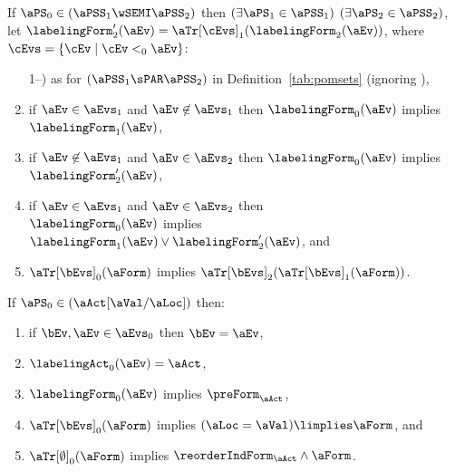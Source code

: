 \begin{definition}
  \noindent
  If $\aPS_0 \in (\aPSS_1\wSEMI\aPSS_2)$ then
  $(\exists\aPS_1\in\aPSS_1)$ $(\exists\aPS_2\in\aPSS_2)$,\\
  let $\labelingForm'_2(\aEv)=\aTr[\cEvs]_1(\labelingForm_2(\aEv))$, where $\cEvs=\{ \cEv \mid \cEv <_0 \aEv \}$:
  \begin{enumerate}  
  \setcounter{enumi}{\value{pomsetParXount}}
  \item[1--\thepomsetParXount)] as for $(\aPSS_1\sPAR\aPSS_2)$  in
    Definition~\ref{tab:pomsets} (ignoring \thepomsetParDisjointXount),
  \item if $\aEv\in\aEvs_1$ and $\aEv\not\in\aEvs_1$ then $\labelingForm_0(\aEv)$ implies $\labelingForm_1(\aEv)$,
  \item if $\aEv\not\in\aEvs_1$ and $\aEv\in\aEvs_2$ then $\labelingForm_0(\aEv)$ implies $\labelingForm'_2(\aEv)$,
  \item if $\aEv\in\aEvs_1$ and $\aEv\in\aEvs_2$ then\\ $\labelingForm_0(\aEv)$ implies $\labelingForm_1(\aEv)\lor\labelingForm'_2(\aEv)$, and
  \item $\aTr[\bEvs]_0(\aForm)$ implies $\aTr[\bEvs]_2(\aTr[\bEvs]_1(\aForm))$.
  \end{enumerate}

  \noindent
  If $\aPS_0 \in (\aAct[\aVal/\aLoc])$ then:
  \begin{enumerate}
  \item if $\bEv,\aEv\in\aEvs_0$ then $\bEv=\aEv$,
  \item $\labelingAct_0(\aEv) = \aAct$,
  \item $\labelingForm_0(\aEv)$ implies $\preForm_\aAct$,
  \item $\aTr[\bEvs]_0(\aForm)$ implies $(\aLoc=\aVal)\limplies\aForm$, and
  \item $\aTr[\emptyset]_0(\aForm)$ implies $\reorderIndForm_\aAct\land\aForm$.
  \end{enumerate}
\end{definition}

